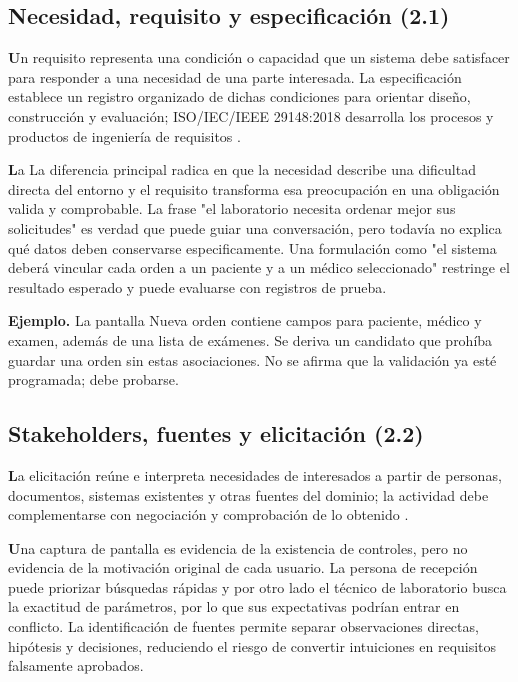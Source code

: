 \clearpage

\subsection{Necesidad, requisito y especificación (2.1)}
\textbf Un requisito representa una condición o capacidad que un sistema debe satisfacer para responder a una necesidad de una parte interesada. La especificación establece un registro organizado de dichas condiciones para orientar diseño, construcción y evaluación; ISO/IEC/IEEE 29148:2018 desarrolla los procesos y productos de ingeniería de requisitos \cite{iso29148}.

\textbf La La diferencia principal radica en que la necesidad describe una dificultad directa del entorno y el requisito transforma esa preocupación en una obligación valida y comprobable. La frase "el laboratorio necesita ordenar mejor sus solicitudes" es verdad que puede guiar una conversación, pero todavía no explica qué datos deben conservarse especificamente. Una formulación como "el sistema deberá vincular cada orden a un paciente y a un médico seleccionado" restringe el resultado esperado y puede evaluarse con registros de prueba.

\textbf{Ejemplo.} La pantalla Nueva orden contiene campos para paciente, médico y examen, además de una lista de exámenes. Se deriva un candidato que prohíba guardar una orden sin estas asociaciones. No se afirma que la validación ya esté programada; debe probarse.

\subsection{Stakeholders, fuentes y elicitación (2.2)}
\textbf La elicitación reúne e interpreta necesidades de interesados a partir de personas, documentos, sistemas existentes y otras fuentes del dominio; la actividad debe complementarse con negociación y comprobación de lo obtenido \cite{pohl2025,swebok2024}.

\textbf Una captura de pantalla es evidencia de la existencia de controles, pero no evidencia de la motivación original de cada usuario. La persona de recepción puede priorizar búsquedas rápidas y por otro lado el técnico de laboratorio busca la exactitud de parámetros, por lo que sus expectativas podrían entrar en conflicto. La identificación de fuentes permite separar observaciones directas, hipótesis y decisiones, reduciendo el riesgo de convertir intuiciones en requisitos falsamente aprobados.

